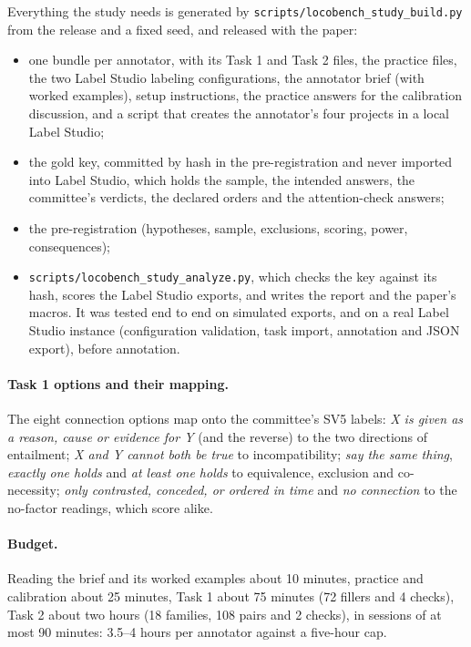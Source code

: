 Everything the study needs is generated by \texttt{scripts/locobench\_study\_build.py} from the
release and a fixed seed, and released with the paper:
\begin{itemize}[leftmargin=1.2em,itemsep=1pt,topsep=2pt]
\item one bundle per annotator, with its Task 1 and Task 2 files, the practice files, the two Label Studio labeling configurations, the annotator brief (with worked examples), setup
  instructions, the practice answers for the calibration discussion, and a script that creates
  the annotator's four projects in a local Label Studio;
\item the gold key, committed by hash in the pre-registration and never imported into Label
  Studio, which holds the sample, the intended answers, the committee's verdicts, the declared
  orders and the attention-check answers;
\item the pre-registration (hypotheses, sample, exclusions, scoring, power, consequences);
\item \texttt{scripts/locobench\_study\_analyze.py}, which checks the key against its hash,
  scores the Label Studio exports, and writes the report and the paper's macros. It was tested
  end to end on simulated exports, and on a real Label Studio instance (configuration validation,
  task import, annotation and JSON export), before annotation.
\end{itemize}

\paragraph{Task 1 options and their mapping.} The eight connection options map onto the
committee's SV5 labels: \emph{X is given as a reason, cause or evidence for Y} (and the reverse)
to the two directions of entailment; \emph{X and Y cannot both be true} to incompatibility;
\emph{say the same thing}, \emph{exactly one holds} and \emph{at least one holds} to equivalence,
exclusion and co-necessity; \emph{only contrasted, conceded, or ordered in time} and \emph{no
connection} to the no-factor readings, which score alike.

\paragraph{Budget.} Reading the brief and its worked examples about 10 minutes, practice and
calibration about 25 minutes, Task 1 about 75 minutes (72
fillers and 4 checks), Task 2 about two hours (18 families, 108 pairs and 2 checks), in sessions
of at most 90 minutes: 3.5--4 hours per annotator against a five-hour cap. 

